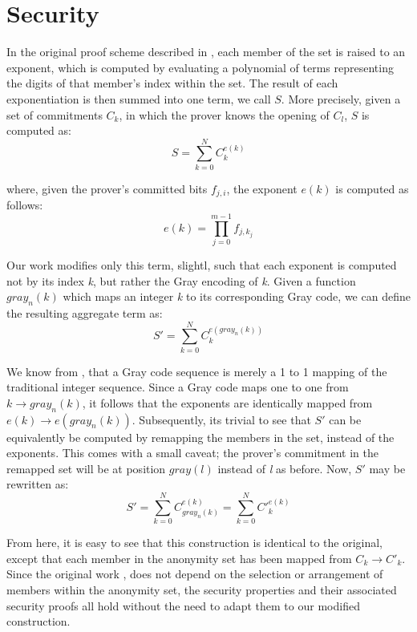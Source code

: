 \documentclass{article}
\begin{document}
\section{Security}
In the original proof scheme described in \cite{groth}, each member of the set is raised to an exponent, which is computed by evaluating a polynomial of terms representing the digits of that member's index within the set. The result of each exponentiation is then summed into one term, we call $S$. More precisely, given a set of commitments $C_k$, in which the prover knows the opening of $C_l$, $S$ is computed as:
$$S = \sum_{k=0}^{N} C_k^{e(k)}$$

where, given the prover's committed bits $f_{j,i}$, the exponent $e(k)$ is computed as follows:
$$e(k) = \prod_{j=0}^{m-1} f_{j,k_j}$$

Our work modifies only this term, slightl, such that each exponent is computed not by its index \emph{k}, but rather the Gray encoding of \emph{k}. Given a function $gray_n(k)$ which maps an integer \emph{k} to its corresponding Gray code, we can define the resulting aggregate term as:
$$S' = \sum_{k=0}^{N} C_k^{e(gray_n(k))}$$

We know from \cite{gray}, that a Gray code sequence is merely a 1 to 1 mapping of the traditional integer sequence. Since a Gray code maps one to one from $k \to gray_n(k)$, it follows that the exponents are identically mapped from $e(k) \to e(gray_n(k))$. Subsequently, its trivial to see that $S'$ can be equivalently be computed by remapping the members in the set, instead of the exponents. This comes with a small caveat; the prover's commitment in the remapped set will be at position $gray(l)$ instead of \emph{l} as before. Now, $S'$ may be rewritten as:
$$S' = \sum_{k=0}^{N} C_{gray_n(k)}^{e(k)} = \sum_{k=0}^{N} C'_k^{e(k)}$$

From here, it is easy to see that this construction is identical to the original, except that each member in the anonymity set has been mapped from $C_k \to C'_k$. Since the original work \cite{groth}, does not depend on the selection or arrangement of members within the anonymity set, the security properties and their associated security proofs all hold without the need to adapt them to our modified construction.
\end{document}
